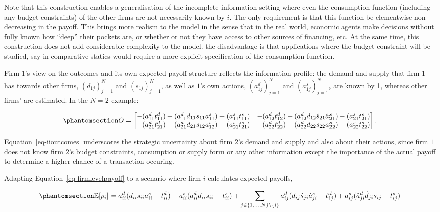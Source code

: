 \documentclass[
]{article}
\theoremstyle{plain}
\theoremstyle{definition}
\theoremstyle{remark}
\begin{document}
Note that this construction enables a generalisation of the incomplete
information setting where even the consumption function (including any
budget constraints) of the other firms are not necessarily known by
\(i\). The only requirement is that this function be elementwise
non-decreasing in the payoff. This brings more realism to the model in
the sense that in the real world, economic agents make decisions without
fully known how ``deep'' their pockets are, or whether or not they have
access to other sources of financing, etc. At the same time, this
construction does not add considerable complexity to the model. the
disadvantage is that applications where the budget constraint will be
studied, say in comparative statics would require a more explicit
specification of the consumption function.

Firm \(1\)'s view on the outcomes and its own expected payoff structure
reflects the information profile: the demand and supply that firm \(1\)
has towards other firms, \((d_{1j})_{j=1}^N\) and \((s_{1j})_{j=1}^N\),
as well as \(1\)'s own actions, \((a_{1j}^d)_{j=1}^N\) and
\((a_{1j}^s)_{j=1}^N\), are known by 1, whereas other firms' are
estimated. In the \(N=2\) example:

\begin{equation}\phantomsection\label{eq-iioutcomes}{
O = 
\begin{bmatrix}
-(a_{11}^d t_{11}^d) + (a_{11}^d d_{11} s_{11} a_{11}^s) - (a_{11}^s t_{11}^s) & -(a_{12}^d t_{12}^d) + (a_{12}^d d_{12} \hat{s}_{21} \hat{a}_{21}^s) - (a_{21}^s t_{21}^s)\\
-(a_{21}^d t_{21}^d) + (a_{21}^d d_{21} s_{12} a_{12}^s) - (a_{21}^s t_{21}^s) & -(a_{22}^d t_{22}^d) + (a_{22}^d d_{22} s_{22} a_{22}^s) - (a_{22}^s t_{22}^s)
\end{bmatrix}.
}\end{equation}

Equation~\ref{eq-iioutcomes} underscores the strategic uncertainty about
firm \(2\)'s demand and supply and also about their actions, since firm
\(1\) does not know firm \(2\)'s budget constraints, consumption or
supply form or any other information except the importance of the actual
payoff to determine a higher chance of a transaction occuring.

Adapting Equation~\ref{eq-firmlevelpayoff} to a scenario where firm
\(i\) calculates expected payoffs,

\begin{equation}\phantomsection\label{eq-iifirmlevelpayoff}{
\mathbb{E}[p_i] = a_{ii}^d (d_{ii} s_{ii} a_{ii}^s - t_{ii}^d) + a_{ii}^s (a_{ii}^d d_{ii} s_{ii} - t_{ii}^s) + \sum_{j \in \{1, \dots, N\}\setminus \{i\}} a_{ij}^d (d_{ij} \hat{s}_{ji} \hat{a}_{ji}^s - t_{ij}^d) + a_{ij}^s (\hat{a}_{ji}^d \hat{d}_{ji} s_{ij} - t_{ij}^s)
}\end{equation}
\end{document}
